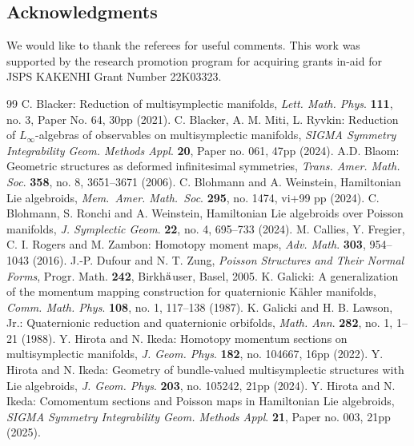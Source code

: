 \documentclass[a4paper,11pt,dvipdfmx]{article}
\numberwithin{equation}{section}
\begin{document}
\subsection*{Acknowledgments}
We would like to thank the referees for useful comments. 
This work was supported by the research promotion program for acquiring
grants in-aid for JSPS KAKENHI Grant Number 22K03323.
\begin{thebibliography}{99}
 C. Blacker: {Reduction of multisymplectic manifolds}, {\em Lett. Math. Phys}. {\bf 111}, no. 3, Paper No. 64, 30pp (2021). %
 C. Blacker, A. M. Miti, L. Ryvkin: {Reduction of $L_{\infty}$-algebras of observables on multisymplectic manifolds}, 
{\em SIGMA Symmetry Integrability Geom. Methods Appl}. {\bf 20}, Paper no. 061, 47pp (2024). %
 A.D. Blaom: {Geometric structures as deformed infinitesimal symmetries}, {\em Trans. Amer. Math. Soc}. {\bf 358}, no. 8, 3651--3671 (2006). 
 C. Blohmann and A. Weinstein, {Hamiltonian Lie algebroids}, {\em Mem.~Amer. Math.~Soc}. {\bf 295}, no. 1474, vi+99 pp (2024). 
 C. Blohmann, S. Ronchi and A. Weinstein, {Hamiltonian Lie algebroids over Poisson manifolds}, {\em J. Symplectic Geom}. {\bf 22}, no. 4, 695--733 (2024). 
 M. Callies, Y. Fregier, C. I. Rogers and M. Zambon: {Homotopy moment maps}, {\em Adv. Math}. {\bf 303}, 954--1043 (2016). 
 J.-P. Dufour and N. T. Zung, {\em Poisson Structures and Their Normal Forms}, Progr. Math. {\bf 242}, Birkh$\ddot{\rm a}$user, Basel, 2005. %
 K. Galicki: {A generalization of the momentum mapping construction for quaternionic K\"{a}hler manifolds}, {\em Comm. Math. Phys}. {\bf 108}, no. 1, 117--138 (1987). 
 K. Galicki and H. B. Lawson, Jr.: {Quaternionic reduction and quaternionic orbifolds}, {\em Math. Ann}. {\bf 282}, no. 1, 1--21 (1988). 
 Y. Hirota and N. Ikeda: {Homotopy momentum sections on multisymplectic manifolds}, {\em J. Geom. Phys}. {\bf 182}, no. 104667, 16pp (2022). 
 Y. Hirota and N. Ikeda: {Geometry of bundle-valued multisymplectic structures with Lie algebroids}, {\em J. Geom. Phys}. {\bf 203}, no. 105242, 21pp (2024). 
 Y. Hirota and N. Ikeda: {Comomentum sections and Poisson maps in Hamiltonian Lie algebroids}, 
{\em SIGMA Symmetry Integrability Geom. Methods Appl}. {\bf 21}, Paper no. 003, 21pp (2025). %

\end{thebibliography}
\end{document}
